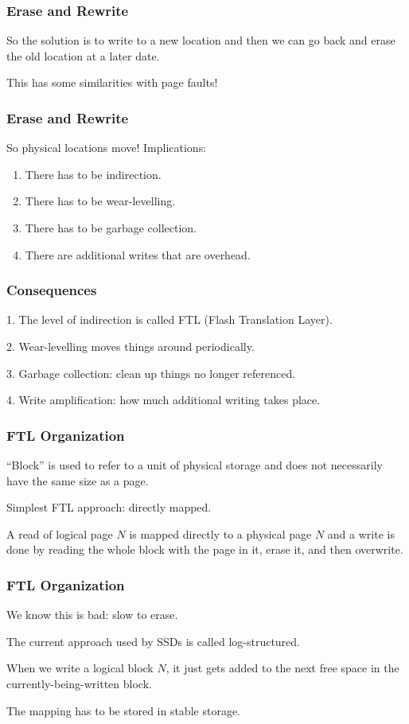 \begin{frame}
\frametitle{Erase and Rewrite}

So the solution is to write to a new location and then we can go back and erase the old location at a later date. 

This has some similarities with page faults!

\end{frame}


\begin{frame}
\frametitle{Erase and Rewrite}

So physical locations move! Implications:

\begin{enumerate}
	\item There has to be indirection.
	\item There has to be wear-levelling.
	\item There has to be garbage collection.
	\item There are additional writes that are overhead.
\end{enumerate}

\end{frame}


\begin{frame}
\frametitle{Consequences}

1. The level of indirection is called \alert{FTL (Flash Translation Layer)}.

2. Wear-levelling moves things around periodically.

3. Garbage collection: clean up things no longer referenced.

4. Write amplification: how much additional writing takes place.

\end{frame}


\begin{frame}
\frametitle{FTL Organization}

``Block'' is used to refer to a unit of physical storage and does not necessarily have the same size as a page. 

Simplest FTL approach: directly mapped. 

A read of logical page $N$ is mapped directly to a physical page $N$ and a write is done by reading the whole block with the page in it, erase it, and then overwrite.

\end{frame}

\begin{frame}
\frametitle{FTL Organization}

We know this is bad: slow to erase.

The current approach used by SSDs is called \alert{log-structured}.

When we write a logical block $N$, it just gets added to the next free space in the currently-being-written block.

The mapping has to be stored in stable storage.

\end{frame}


